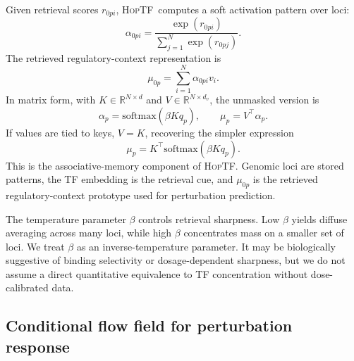\documentclass[11pt]{article}
\newcommand{\hoptf}{\textsc{HopTF}}
\begin{document}
Given retrieval scores \(r_{0pi}\), \hoptf\ computes a soft activation pattern over loci:
\begin{equation}
    \alpha_{0pi} = \frac{\exp(r_{0pi})}{\sum_{j=1}^{N}\exp(r_{0pj})}.
\end{equation}
The retrieved regulatory-context representation is
\begin{equation}
    \mu_{0p} = \sum_{i=1}^{N} \alpha_{0pi} v_i.
\end{equation}
In matrix form, with \(K \in \mathbb{R}^{N \times d}\) and \(V \in \mathbb{R}^{N \times d_v}\), the unmasked version is
\begin{equation}
    \alpha_{p}=\mathrm{softmax}(\beta K q_p), \qquad \mu_p = V^\top \alpha_p.
\end{equation}
If values are tied to keys, \(V=K\), recovering the simpler expression
\begin{equation}
    \mu_p = K^\top \mathrm{softmax}(\beta K q_p).
\end{equation}
This is the associative-memory component of \hoptf. Genomic loci are stored patterns, the TF embedding is the retrieval cue, and \(\mu_{0p}\) is the retrieved regulatory-context prototype used for perturbation prediction.

The temperature parameter \(\beta\) controls retrieval sharpness. Low \(\beta\) yields diffuse averaging across many loci, while high \(\beta\) concentrates mass on a smaller set of loci. We treat \(\beta\) as an inverse-temperature parameter. It may be biologically suggestive of binding selectivity or dosage-dependent sharpness, but we do not assume a direct quantitative equivalence to TF concentration without dose-calibrated data.

\subsection{Conditional flow field for perturbation response}
\end{document}
